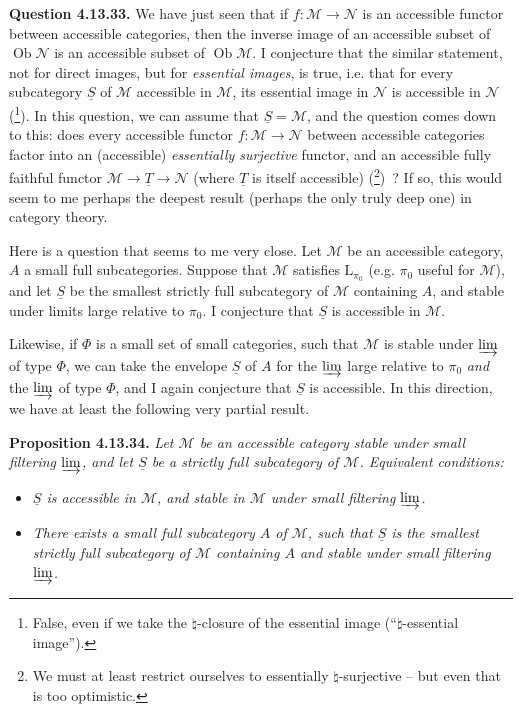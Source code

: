 \documentclass[11pt]{article}
\newcommand{\printedpage}[1]{\marginpar{\footnotesize p.~#1}}
\newcommand{\msp}[1]{\marginpar{\footnotesize [#1]}}
\newcommand{\Ob}{\operatorname{Ob}}
\newcommand{\limind}{\varinjlim}
\begin{document}
\textbf{Question 4.13.33.} We have just seen that if $f : \mathcal{M} \longrightarrow \mathcal{N}$ is an accessible functor between accessible categories, then the inverse image of an accessible subset of $\Ob \mathcal{N}$ is an accessible subset of $\Ob \mathcal{M}$. I conjecture that the similar statement, not for direct images, but for \textit{essential images}, is
\msp{page 354}
true, i.e. that for every subcategory $\underline{S}$ of $\mathcal{M}$ accessible in $\mathcal{M}$, its essential image in $\mathcal{N}$ is accessible in $\mathcal{N}$ (\footnote[156]{False, even if we take the $\natural$-closure of the essential image (``$\natural$-essential image'').}). In this question, we can assume that $\underline{S} = \mathcal{M}$, and the question comes down to this: does every accessible functor $f : \mathcal{M} \longrightarrow \mathcal{N}$ between accessible categories factor into an (accessible) \textit{essentially surjective} functor, and an accessible fully faithful functor $\mathcal{M} \longrightarrow \underline{T} \longrightarrow \mathcal{N}$ (where $\underline{T}$ is itself accessible) (\footnote[157]{We must at least restrict ourselves to essentially $\natural$-surjective – but even that is too optimistic.})~? If so, this would seem to me perhaps the deepest result (perhaps the only truly deep one) in category theory. %

Here is a question that seems to me very close. Let $\mathcal{M}$ be an accessible category, $A$ a small full subcategories. Suppose that $\mathcal{M}$ satisfies $\mathrm{L}_{\pi_0}$ (e.g. $\pi_0$ useful for $\mathcal{M}$), and let $\underline{S}$ be the smallest strictly full subcategory of $\mathcal{M}$ containing $A$, and stable under limits large relative to $\pi_0$. I conjecture that $\underline{S}$ is accessible in $\mathcal{M}$. %

\msp{page 355}

Likewise, if $\Phi$ is a small set of small categories, such that $\mathcal{M}$ is stable under $\limind$ of type $\Phi$, we can take the envelope $\underline{S}$ of $A$ for the $\limind$ large relative to $\pi_0$ \textit{and} the
\printedpage{135}
$\limind$ of type $\Phi$, and I again conjecture that $\underline{S}$ is accessible. In this direction, we have at least the following very partial result.

\textbf{Proposition 4.13.34.} \textit{Let $\mathcal{M}$ be an accessible category stable under small filtering $\limind$, and let $\underline{S}$ be a strictly full subcategory of $\mathcal{M}$. Equivalent conditions:}
\begin{itemize}[leftmargin=2.5em]
\item[\textit{a)}] \textit{$\underline{S}$ is accessible in $\mathcal{M}$, and stable in $\mathcal{M}$ under small filtering $\limind$.}
\item[\textit{b)}] \textit{There exists a small full subcategory $A$ of $\mathcal{M}$, such that $\underline{S}$ is the smallest strictly full subcategory of $\mathcal{M}$ containing $A$ and stable under small filtering $\limind$.}
\end{itemize}
\end{document}
